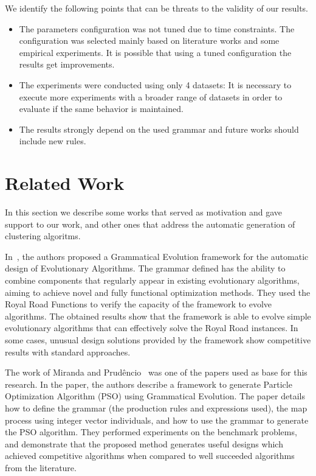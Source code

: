 \documentclass[conference,compsoc]{IEEEtran}
\begin{document}
We identify the following points that can be threats to the validity of our results.
\begin{itemize}
	\item The parameters configuration was not tuned due to time constraints. The configuration was selected mainly based on literature works and some empirical experiments. It is possible that using a tuned configuration the results get improvements.
	\item The experiments were conducted using only 4 datasets: It is necessary to execute more experiments with a broader range of datasets in order to evaluate if the same behavior is maintained.
	\item The results strongly depend on the used grammar and future works should include new rules.
\end{itemize}




\section{Related Work} \label{sec:related_work}

In this section we describe some works that served as motivation and gave support to our work, and other ones that address the automatic generation of clustering algoritms.  

In~\cite{lourencco2012evolving,lourencco2015IEEE}, the authors proposed a Grammatical Evolution framework for the automatic design of Evolutionary Algorithms. The grammar defined has the ability to combine components that regularly appear in existing evolutionary algorithms, aiming to achieve novel and fully functional optimization methods. They used the Royal Road Functions to verify the capacity of the framework to evolve algorithms. The obtained results show that the framework is able to evolve simple evolutionary algorithms that can effectively solve the Royal Road instances. In some cases, unusual design solutions provided by the framework show competitive results with standard approaches.

The work of Miranda and Prud\^encio~\cite{miranda2015gefpso} was one of the papers used as base for this research. In the paper, the authors describe a framework to generate Particle Optimization Algorithm (PSO) using Grammatical Evolution. The paper details how to define the grammar (the production rules and expressions used), the map process using integer vector individuals, and how to use the grammar to generate the PSO algorithm. They performed experiments on the benchmark problems, and demonstrate that the proposed method generates useful designs which achieved competitive algorithms when compared to well succeeded algorithms from the literature.
\end{document}
